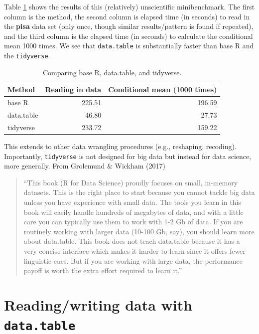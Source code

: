 \documentclass[]{book}
\begin{document}
Table \ref{tab:benchresults} shows the results of this (relatively) unscientific minibenchmark. The first column is the method, the second column is elapsed time (in seconds) to read in the \textbf{pisa} data set (only once, though similar results/pattern is found if repeated), and the third column is the elapsed time (in seconds) to calculate the conditional mean 1000 times. We see that \texttt{data.table} is substantially faster than base R and the \texttt{tidyverse}.

\begin{table}

\caption{\label{tab:benchresults}Comparing base R, data.table, and tidyverse.}
\centering
\begin{tabular}[t]{l|r|r}
\hline
Method & Reading in data & Conditional mean (1000 times)\\
\hline
base R & 225.51 & 196.59\\
\hline
data.table & 46.80 & 27.73\\
\hline
tidyverse & 233.72 & 159.22\\
\hline
\end{tabular}
\end{table}

This extends to other data wrangling procedures (e.g., reshaping, recoding). Importantly, \texttt{tidyverse} is not designed for big data but instead for data science, more generally. From Grolemund \& Wickham (2017)

\begin{quote}
``This book (R for Data Science) proudly focuses on small, in-memory datasets. This is the right place to start because you cannot tackle big data unless you have experience with small data. The tools you learn in this book will easily handle hundreds of megabytes of data, and with a little care you can typically use them to work with 1-2 Gb of data. If you are routinely working with larger data (10-100 Gb, say), you should learn more about data.table. This book does not teach data.table because it has a very concise interface which makes it harder to learn since it offers fewer linguistic cues. But if you are working with large data, the performance payoff is worth the extra effort required to learn it.''
\end{quote}

\hypertarget{readingwriting-data-with-data.table}{%
\section{\texorpdfstring{Reading/writing data with \texttt{data.table}}{Reading/writing data with data.table}}\label{readingwriting-data-with-data.table}}
\end{document}
